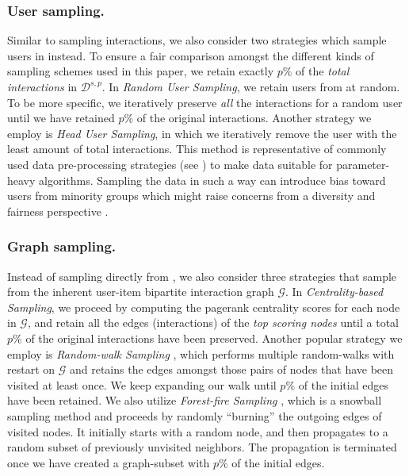 \subsubsection{User sampling. \ \ } Similar to sampling interactions, we also consider two strategies which sample users in \dataset instead. To ensure a fair comparison amongst the different kinds of sampling schemes used in this paper, we retain exactly $p\%$ of the \emph{total interactions} in $\mathcal{D}^{s, p}$. In \emph{Random User Sampling}, we retain users from \dataset at random. To be more specific, we iteratively preserve \emph{all} the interactions for a random user until we have retained $p\%$ of the original interactions. Another strategy we employ is \emph{Head User Sampling}, in which we iteratively remove the user with the least amount of total interactions. This method is representative of commonly used data pre-processing strategies (see \eg \cite{mvae, neural_mf}) to make data suitable for parameter-heavy algorithms. Sampling the data in such a way can introduce bias toward users from minority groups which might raise concerns from a diversity and fairness perspective \cite{fairness}.

\subsubsection{Graph sampling. \ \ } Instead of sampling directly from \dataset, we also consider three strategies that sample from the inherent user-item bipartite interaction graph $\mathcal{G}$. In \emph{Centrality-based Sampling}, we proceed by computing the pagerank centrality scores \cite{pagerank} for each node in $\mathcal{G}$, and retain all the edges (interactions) of the \emph{top scoring nodes} until a total $p\%$ of the original interactions have been preserved. Another popular strategy we employ is \emph{Random-walk Sampling} \cite{large_graphs}, which performs multiple random-walks with restart on $\mathcal{G}$ and retains the edges amongst those pairs of nodes that have been visited at least once. We keep expanding our walk until $p\%$ of the initial edges have been retained. We also utilize \emph{Forest-fire Sampling} \cite{forest_fire}, which is a snowball sampling method and proceeds by randomly ``burning'' the outgoing edges of visited nodes. It initially starts with a random node, and then propagates to a random subset of previously unvisited neighbors. The propagation is terminated once we have created a graph-subset with $p\%$ of the initial edges.

